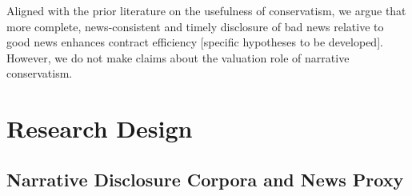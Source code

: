 \documentclass[a4paper]{article}
\begin{document}
\begin{spacing}{2}

Aligned with the prior literature on the usefulness of conservatism, we argue that more complete, news-consistent and timely disclosure of bad news relative to good news enhances contract efficiency [specific hypotheses to be developed]. However, we do not make claims about the valuation role of narrative conservatism.

\section{Research Design}
\subsection{Narrative Disclosure Corpora and News Proxy} \label{sec3.1}

\end{spacing}
\end{document}
